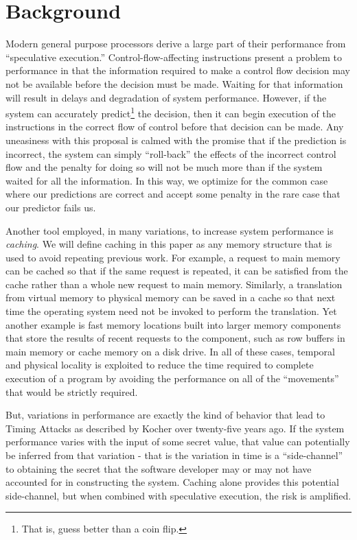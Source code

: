 \documentclass[11pt,conference]{IEEEtran}
\begin{document}
\section{Background}\label{sec:background}

Modern general purpose processors derive a large part of their performance from ``speculative execution.''
Control-flow-affecting instructions present a problem to performance in that the information required to make a control flow decision may not be available before the decision must be made.
Waiting for that information will result in delays and degradation of system performance.
However, if the system can accurately predict\footnote{That is, guess better than a coin flip.} the decision, then it can begin execution of the instructions in the correct flow of control before that decision can be made.
Any uneasiness with this proposal is calmed with the promise that if the prediction is incorrect, the system can simply ``roll-back'' the effects of the incorrect control flow and the penalty for doing so will not be much more than if the system waited for all the information.
In this way, we optimize for the common case where our predictions are correct and accept some penalty in the rare case that our predictor fails us.

Another tool employed, in many variations, to increase system performance is \emph{caching}.
We will define caching in this paper as any memory structure that is used to avoid repeating previous work.
For example, a request to main memory can be cached so that if the same request is repeated, it can be satisfied from the cache rather than a whole new request to main memory.
Similarly, a translation from virtual memory to physical memory can be saved in a cache so that next time the operating system need not be invoked to perform the translation.
Yet another example is fast memory locations built into larger memory components that store the results of recent requests to the component, such as row buffers in main memory or cache memory on a disk drive.
In all of these cases, temporal and physical locality is exploited to reduce the time required to complete execution of a program by avoiding the performance on all of the ``movements'' that would be strictly required.

But, variations in performance are exactly the kind of behavior that lead to Timing Attacks as described by Kocher over twenty-five years ago\cite{kocher96}.
If the system performance varies with the input of some secret value, that value can potentially be inferred from that variation - that is the variation in time is a ``side-channel'' to obtaining the secret that the software developer may or may not have accounted for in constructing the system.
Caching alone provides this potential side-channel\cite{shepherd2022transient}, but when combined with speculative execution, the risk is amplified.
\end{document}
